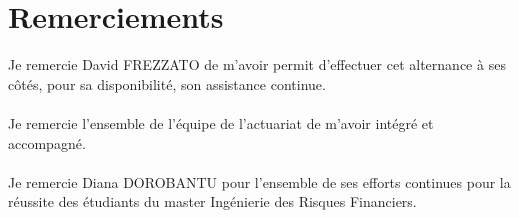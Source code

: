 \chapter*{Remerciements} 

Je remercie David FREZZATO de m'avoir permit d'effectuer cet alternance à ses côtés, pour sa disponibilité, son assistance continue.  	
\\
\\
Je remercie l'ensemble de l'équipe de l’actuariat de m'avoir intégré et accompagné.
\\
\\
Je remercie Diana DOROBANTU pour l'ensemble de ses efforts continues pour la réussite des étudiants du master Ingénierie des Risques Financiers.
\\
\\
\\
\\